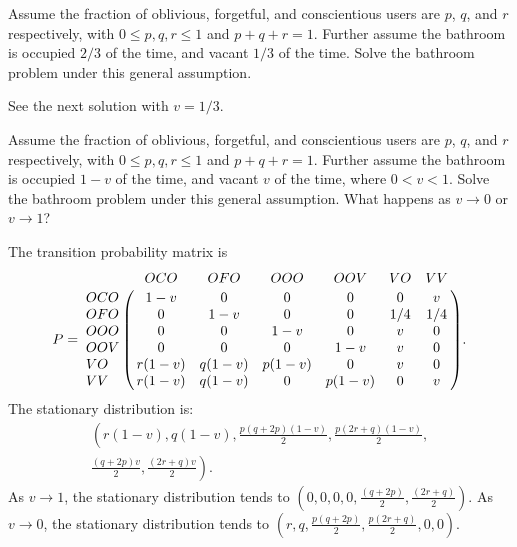 \documentclass[12pt]{article}
\begin{document}
\begin{exercise}
    Assume the fraction of oblivious, forgetful, and conscientious users
    are \( p \), \( q \), and \( r \) respectively, with \( 0 \le p,q,r
    \le 1 \) and \( p + q + r = 1 \).  Further assume the bathroom is
    occupied \( 2/3 \) of the time, and vacant \( 1/3 \) of the time.
    Solve the bathroom problem under this general assumption.

\end{exercise}
\begin{solution}
    See the next solution with \( v = 1/3 \).
\end{solution}

\begin{exercise}
    Assume the fraction of oblivious, forgetful, and conscientious users
    are \( p \), \( q \), and \( r \) respectively, with \( 0 \le p,q,r
    \le 1 \) and \( p + q + r = 1 \).  Further assume the bathroom is
    occupied \( 1-v \) of the time, and vacant \( v \) of the time,
    where \( 0 < v < 1 \).  Solve the bathroom problem under this
    general assumption.  What happens as \( v \to 0 \) or \( v \to 1 \)?
\end{exercise}
\begin{solution}
    The transition probability matrix is
    \[
        P= \bordermatrix{ & OCO & OFO & OOO & OOV & VO & VV \cr
        OCO & 1-v & 0 & 0 & 0 & 0 & v \cr
        OFO & 0 & 1-v & 0 & 0 & 1/4 & 1/4 \cr
        OOO & 0 & 0 & 1-v & 0 & v & 0 \cr
        OOV & 0 & 0 & 0 & 1-v & v & 0 \cr
        VO & r(1-v) & q(1-v) & p(1-v) & 0 & v & 0 \cr
        VV & r(1-v) & q(1-v) & 0 & p(1-v) & 0 & v \cr
        }.
      \] The stationary distribution is:
      \begin{multline*}
        \left( r(1-v), q(1-v), \frac{p(q + 2p)(1-v)}{2}, \frac{p(2r + q)
            (1-v)}{2}, \right.\\
          \left. \frac{(q + 2p)v}{2}, \frac{(2r + q)v}{2} \right).
      \end{multline*}
    As \( v \to 1 \), the stationary distribution tends to \( \left(0,
    0, 0, 0, \frac{(q + 2p)}{2}, \frac{(2r + q)}{2} \right) \). As \( v
    \to 0 \), the stationary distribution tends to \( \left(r, q, \frac{p
    (q + 2p)}{2}, \frac{p(2r + q)}{2}, 0, 0 \right) \).
\end{solution}
\end{document}
